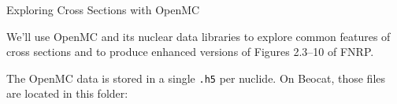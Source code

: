\documentclass[aspectratio=1610]{beamer}
\begin{document}
\begin{frame}[fragile]{Exploring Cross Sections with OpenMC}

We'll use OpenMC and its nuclear data libraries to
explore common features of cross sections and to produce 
enhanced versions of Figures 2.3--10 of FNRP.  


\begin{Shaded}
\begin{Highlighting}[]
\end{Highlighting}
\end{Shaded}

\vfill 

The OpenMC data is stored in a single \texttt{.h5} per nuclide. 
On Beocat, those files are located in this folder:
\begin{Shaded}
\begin{Highlighting}[]
\OperatorTok{=} 
\end{Highlighting}
\end{Shaded}

\end{frame}
\end{document}
